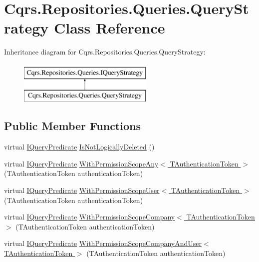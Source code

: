 \hypertarget{classCqrs_1_1Repositories_1_1Queries_1_1QueryStrategy}{}\section{Cqrs.\+Repositories.\+Queries.\+Query\+Strategy Class Reference}
\label{classCqrs_1_1Repositories_1_1Queries_1_1QueryStrategy}
Inheritance diagram for Cqrs.\+Repositories.\+Queries.\+Query\+Strategy\+:\begin{figure}[H]
\begin{center}
\leavevmode
\includegraphics[height=2.000000cm]{classCqrs_1_1Repositories_1_1Queries_1_1QueryStrategy}
\end{center}
\end{figure}
\subsection*{Public Member Functions}
\begin{DoxyCompactItemize}
\item 
virtual \hyperlink{interfaceCqrs_1_1Repositories_1_1Queries_1_1IQueryPredicate}{I\+Query\+Predicate} \hyperlink{classCqrs_1_1Repositories_1_1Queries_1_1QueryStrategy_ab1841119fbbb58337d55b014a8b260b4}{Is\+Not\+Logically\+Deleted} ()
\item 
virtual \hyperlink{interfaceCqrs_1_1Repositories_1_1Queries_1_1IQueryPredicate}{I\+Query\+Predicate} \hyperlink{classCqrs_1_1Repositories_1_1Queries_1_1QueryStrategy_a7fda4380a88972201258bf695ccaf287}{With\+Permission\+Scope\+Any$<$ T\+Authentication\+Token $>$} (T\+Authentication\+Token authentication\+Token)
\item 
virtual \hyperlink{interfaceCqrs_1_1Repositories_1_1Queries_1_1IQueryPredicate}{I\+Query\+Predicate} \hyperlink{classCqrs_1_1Repositories_1_1Queries_1_1QueryStrategy_ad8b52782f5410a399949417b10820780}{With\+Permission\+Scope\+User$<$ T\+Authentication\+Token $>$} (T\+Authentication\+Token authentication\+Token)
\item 
virtual \hyperlink{interfaceCqrs_1_1Repositories_1_1Queries_1_1IQueryPredicate}{I\+Query\+Predicate} \hyperlink{classCqrs_1_1Repositories_1_1Queries_1_1QueryStrategy_a822a0901976ceadb3f096326860e3006}{With\+Permission\+Scope\+Company$<$ T\+Authentication\+Token $>$} (T\+Authentication\+Token authentication\+Token)
\item 
virtual \hyperlink{interfaceCqrs_1_1Repositories_1_1Queries_1_1IQueryPredicate}{I\+Query\+Predicate} \hyperlink{classCqrs_1_1Repositories_1_1Queries_1_1QueryStrategy_ac21d8e8a04e218e1a7c283ad181e0e9f}{With\+Permission\+Scope\+Company\+And\+User$<$ T\+Authentication\+Token $>$} (T\+Authentication\+Token authentication\+Token)
\end{DoxyCompactItemize}
